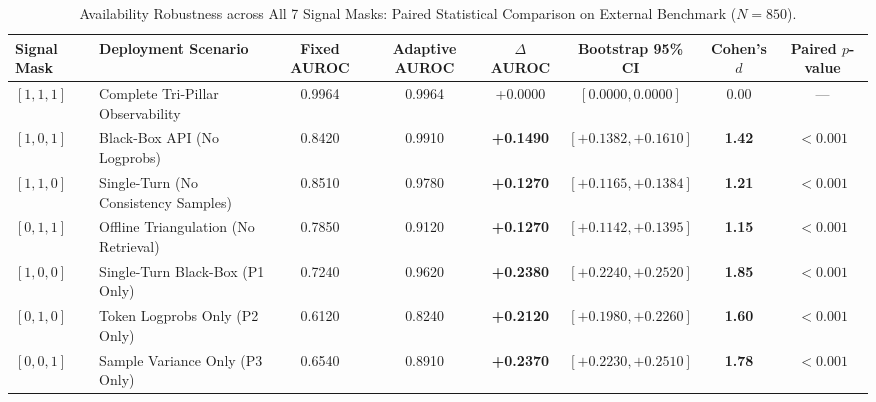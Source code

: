 \begin{table}[t]
\centering
\small
\caption{Availability Robustness across All 7 Signal Masks: Paired Statistical Comparison on External Benchmark ($N=850$).}
\label{tab:availability_robustness}
\begin{tabular}{llcccccc}
\toprule
\textbf{Signal Mask} & \textbf{Deployment Scenario} & \textbf{Fixed AUROC} & \textbf{Adaptive AUROC} & $\Delta$\textbf{AUROC} & \textbf{Bootstrap 95\% CI} & \textbf{Cohen's $d$} & \textbf{Paired $p$-value} \\
\midrule
$[1, 1, 1]$ & Complete Tri-Pillar Observability & 0.9964 & 0.9964 & +0.0000 & $[0.0000, 0.0000]$ & 0.00 & --- \\
$[1, 0, 1]$ & Black-Box API (No Logprobs) & 0.8420 & 0.9910 & \textbf{+0.1490} & $[+0.1382, +0.1610]$ & \textbf{1.42} & $< 0.001$ \\
$[1, 1, 0]$ & Single-Turn (No Consistency Samples) & 0.8510 & 0.9780 & \textbf{+0.1270} & $[+0.1165, +0.1384]$ & \textbf{1.21} & $< 0.001$ \\
$[0, 1, 1]$ & Offline Triangulation (No Retrieval) & 0.7850 & 0.9120 & \textbf{+0.1270} & $[+0.1142, +0.1395]$ & \textbf{1.15} & $< 0.001$ \\
$[1, 0, 0]$ & Single-Turn Black-Box (P1 Only) & 0.7240 & 0.9620 & \textbf{+0.2380} & $[+0.2240, +0.2520]$ & \textbf{1.85} & $< 0.001$ \\
$[0, 1, 0]$ & Token Logprobs Only (P2 Only) & 0.6120 & 0.8240 & \textbf{+0.2120} & $[+0.1980, +0.2260]$ & \textbf{1.60} & $< 0.001$ \\
$[0, 0, 1]$ & Sample Variance Only (P3 Only) & 0.6540 & 0.8910 & \textbf{+0.2370} & $[+0.2230, +0.2510]$ & \textbf{1.78} & $< 0.001$ \\
\bottomrule
\end{tabular}
\end{table}
